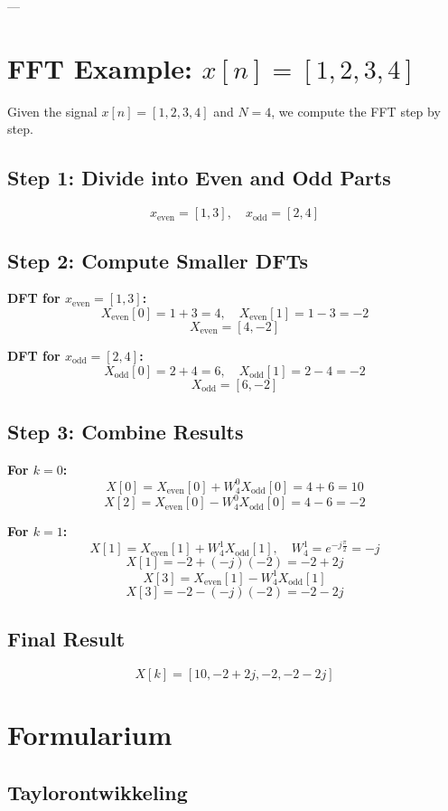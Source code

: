 \documentclass[a4paper]{report}
\begin{document}
---

\section*{FFT Example: \( x[n] = [1, 2, 3, 4] \)}

Given the signal \( x[n] = [1, 2, 3, 4] \) and \( N = 4 \), we compute the FFT step by step.

\subsection*{Step 1: Divide into Even and Odd Parts}
\[
	x_{\text{even}} = [1, 3], \quad x_{\text{odd}} = [2, 4]
\]

\subsection*{Step 2: Compute Smaller DFTs}
\textbf{DFT for \( x_{\text{even}} = [1, 3] \):}
\[
	X_{\text{even}}[0] = 1 + 3 = 4, \quad X_{\text{even}}[1] = 1 - 3 = -2
\]
\[
	X_{\text{even}} = [4, -2]
\]

\textbf{DFT for \( x_{\text{odd}} = [2, 4] \):}
\[
	X_{\text{odd}}[0] = 2 + 4 = 6, \quad X_{\text{odd}}[1] = 2 - 4 = -2
\]
\[
	X_{\text{odd}} = [6, -2]
\]

\subsection*{Step 3: Combine Results}
\textbf{For \( k = 0 \):}
\[
	X[0] = X_{\text{even}}[0] + W_4^0 X_{\text{odd}}[0] = 4 + 6 = 10
\]
\[
	X[2] = X_{\text{even}}[0] - W_4^0 X_{\text{odd}}[0] = 4 - 6 = -2
\]

\textbf{For \( k = 1 \):}
\[
	X[1] = X_{\text{even}}[1] + W_4^1 X_{\text{odd}}[1], \quad W_4^1 = e^{-j\frac{\pi}{2}} = -j
\]
\[
	X[1] = -2 + (-j)(-2) = -2 + 2j
\]
\[
	X[3] = X_{\text{even}}[1] - W_4^1 X_{\text{odd}}[1]
\]
\[
	X[3] = -2 - (-j)(-2) = -2 - 2j
\]

\subsection*{Final Result}
\[
	X[k] = [10, -2 + 2j, -2, -2 - 2j]
\]




\section*{Formularium}

\subsection*{Taylorontwikkeling}
\end{document}
